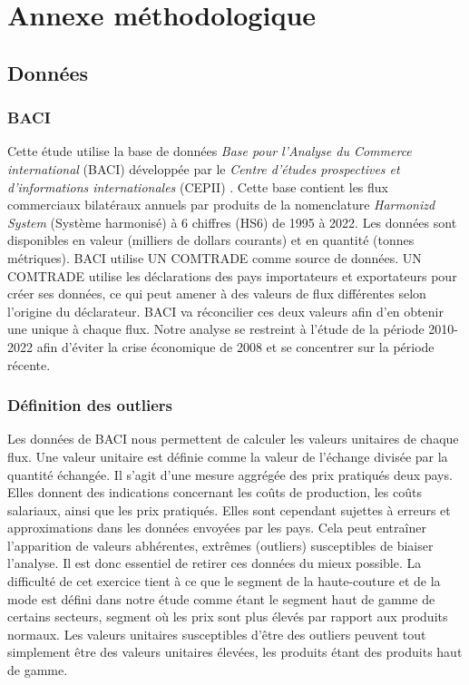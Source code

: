 \documentclass[french,10pt,a4paper]{article}
\begin{document}
\newpage

\section*{Annexe méthodologique}
\subsection*{Données}
\subsubsection*{BACI}
Cette étude utilise la base de données \textit{Base pour l'Analyse du Commerce international} (BACI) développée par le \textit{Centre d'études prospectives et d'informations internationales} (CEPII) \citep{Gaulier2010}. Cette base contient les flux commerciaux bilatéraux annuels par produits de la nomenclature \textit{Harmonizd System} (Système harmonisé) à 6 chiffres (HS6) de 1995 à 2022. Les données sont disponibles en valeur (milliers de dollars courants) et en quantité (tonnes métriques). BACI utilise UN COMTRADE comme source de données. UN COMTRADE utilise les déclarations des pays importateurs et exportateurs pour créer ses données, ce qui peut amener à des valeurs de flux différentes selon l'origine du déclarateur. BACI va réconcilier ces deux valeurs afin d'en obtenir une unique à chaque flux. Notre analyse se restreint à l'étude de la période 2010-2022 afin d'éviter la crise économique de 2008 et se concentrer sur la période récente.

\subsubsection*{Définition des outliers}
Les données de BACI nous permettent de calculer les valeurs unitaires de chaque flux. Une valeur unitaire est définie comme la valeur de l'échange divisée par la quantité échangée. Il s'agit d'une mesure aggrégée des prix pratiqués deux pays. Elles donnent des indications concernant les coûts de production, les coûts salariaux, ainsi que les prix pratiqués. Elles sont cependant sujettes à erreurs et approximations dans les données envoyées par les pays. Cela peut entraîner l'apparition de valeurs abhérentes, extrêmes (outliers) susceptibles de biaiser l'analyse. Il est donc essentiel de retirer ces données du mieux possible. La difficulté de cet exercice tient à ce que le segment de la haute-couture et de la mode est défini dans notre étude comme étant le segment haut de gamme de certains secteurs, segment où les prix sont plus élevés par rapport aux produits normaux. Les valeurs unitaires susceptibles d'être des outliers peuvent tout simplement être des valeurs unitaires élevées, les produits étant des produits haut de gamme.
\end{document}
